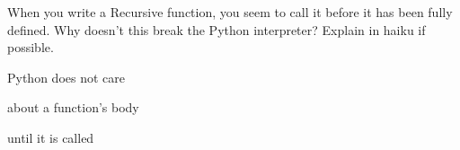 \begin{blocksection}
\question When you write a Recursive function, you seem to call it before it has
been fully defined. Why doesn't this break the Python interpreter? Explain in
haiku if possible.

\begin{solution}[0.25in]
Python does not care

about a  function's body

until it is called
\end{solution}
\end{blocksection}
